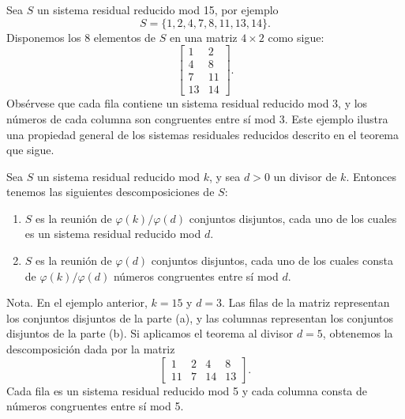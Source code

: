 \documentclass[12pt,a4paper]{book}
\begin{document}
    Sea $S$ un sistema residual reducido mod 15, por ejemplo
    \begin{equation*}
        S=\{1,2,4,7,8,11,13,14\}.
    \end{equation*}
    Disponemos los 8 elementos de $S$ en una matriz $4\times2$ como sigue:
    \begin{equation*}
        \begin{bmatrix}
            1&2\\
            4&8\\
            7&11\\
            13&14
        \end{bmatrix}.
    \end{equation*}
    Obsérvese que cada fila contiene un sistema residual reducido mod 3, y los números de
    cada columna son congruentes entre sí mod 3. Este ejemplo ilustra una propiedad
    general de los sistemas residuales reducidos descrito en el teorema que sigue.

    \begin{teorema}
        Sea $S$ un sistema residual reducido mod $k$, y sea $d>0$ un divisor de $k$.
        Entonces tenemos las siguientes descomposiciones de $S$:
        \begin{enumerate}
            \item[(a)] $S$ es la reunión de $\varphi(k)/\varphi(d)$ conjuntos disjuntos,
            cada uno de los cuales es un sistema residual reducido mod $d$.
            \item[(b)] $S$ es la reunión de $\varphi(d)$ conjuntos disjuntos, cada uno de
            los cuales consta de $\varphi(k)/\varphi(d)$ números congruentes entre sí
            mod $d$.
        \end{enumerate}
    \end{teorema}

    Nota. En el ejemplo anterior, $k=15$ y $d=3$. Las filas de la matriz representan los
    conjuntos disjuntos de la parte (a), y las columnas representan los conjuntos
    disjuntos de la parte (b). Si aplicamos el teorema al divisor $d=5$, obtenemos la
    descomposición dada por la matriz
    \begin{equation*}
        \begin{bmatrix}
            1&2&4&8\\
            11&7&14&13
        \end{bmatrix}.
    \end{equation*}
    Cada fila es un sistema residual reducido mod 5 y cada columna consta de números
    congruentes entre sí mod 5.
\end{document}
